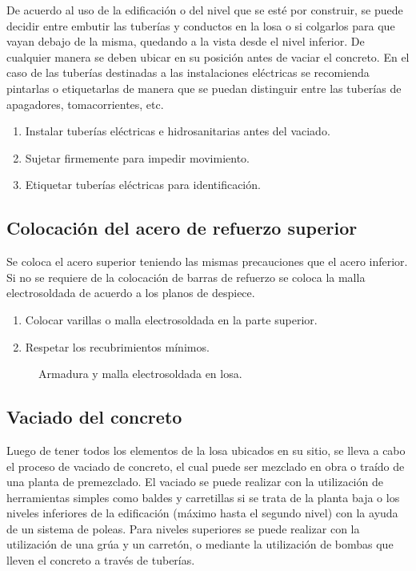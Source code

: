 \documentclass[12pt,a4paper]{article}
\begin{document}
		De acuerdo al uso de la edificación o del nivel que se esté por construir, se puede
		decidir entre embutir las tuberías y conductos en la losa o si colgarlos para que
		vayan debajo de la misma, quedando a la vista desde el nivel inferior. De cualquier
		manera se deben ubicar en su posición antes de vaciar el concreto. En el caso de
		las tuberías destinadas a las instalaciones eléctricas se recomienda pintarlas o
		etiquetarlas de manera que se puedan distinguir entre las tuberías de apagadores,
		tomacorrientes, etc.
		
	\begin{enumerate}
		\item Instalar tuberías eléctricas e hidrosanitarias antes del vaciado.
		\item Sujetar firmemente para impedir movimiento.
		\item Etiquetar tuberías eléctricas para identificación.
	\end{enumerate}
	
	\subsection{Colocación del acero de refuerzo superior}
	Se coloca el acero superior teniendo las mismas precauciones que el acero
	inferior. Si no se requiere de la colocación de barras de refuerzo se coloca la malla
	electrosoldada de acuerdo a los planos de despiece.
	
	\begin{enumerate}
		\item Colocar varillas o malla electrosoldada en la parte superior.
		\item Respetar los recubrimientos mínimos.
	\end{enumerate}
	
	\begin{figure}[h]
		\centering
		\caption{Armadura y malla electrosoldada en losa.}
	\end{figure}
	
	\subsection{Vaciado del concreto}
	Luego de tener todos los elementos de la losa ubicados en su sitio, se lleva a cabo
	el proceso de vaciado de concreto, el cual puede ser mezclado en obra o traído de
	una planta de premezclado.
	El vaciado se puede realizar con la utilización de herramientas simples como
	baldes y carretillas si se trata de la planta baja o los niveles inferiores de la
	edificación (máximo hasta el segundo nivel) con la ayuda de un sistema de poleas.
	Para niveles superiores se puede realizar con la utilización de una grúa y un
	carretón, o mediante la utilización de bombas que lleven el concreto a través de
	tuberías.
	
\end{document}
